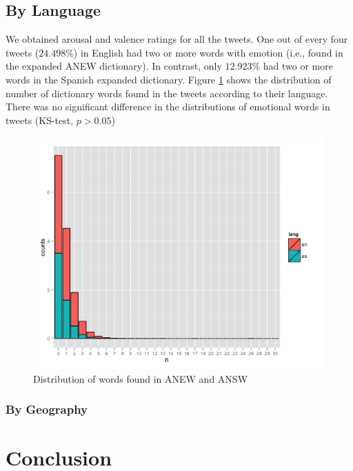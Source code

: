 \documentclass[11pt]{article}
\begin{document}
\subsection{By Language}
We obtained arousal and valence ratings for all the tweets. One out of every four tweets ($24.498\%$) in English had two or more words with emotion (i.e., found in the expanded ANEW dictionary). In contrast, only $12.923\%$ had two or more words in the Spanish expanded dictionary. Figure \ref{fig:distrEmolang} shows the distribution of number of dictionary words found in the tweets according to their language. There was no significant difference in the distributions of emotional words in tweets (KS-test, $p > 0.05$)

\begin{figure}[tb]
	\centering
	\includegraphics[scale=.6]{distr_Emotion_lang}
	\caption{Distribution of words found in ANEW and ANSW}
	\label{fig:distrEmolang}
\end{figure}

\subsubsection{By Geography}

\section{Conclusion}



\end{document}
